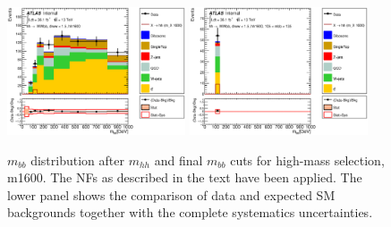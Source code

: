 \begin{figure}
\begin{center}
\includegraphics*[width=0.47\textwidth] {figures/Unblinded_mbb/C_reOpt2000_bbpt350_wwpt250_drww15_hh1600_bbMass_regionA_met25d020.eps}
\includegraphics*[width=0.47\textwidth] {figures/Unblinded_mbb/C_reOpt2000_bbpt350_wwpt250_drww15_hh1600_mbb_bbMass_regionA_met25d020.eps}
\caption[$m_{bb}$ distribution after $m_{hh}$ and final $m_{bb}$ cuts for high-mass selection, m1600.]{$m_{bb}$ distribution after $m_{hh}$ and final $m_{bb}$ cuts for high-mass selection, m1600. The NFs as described in the text have been applied. The lower panel shows the comparison of data and expected SM backgrounds together with the complete systematics uncertainties.}
\end{center}
\end{figure}

